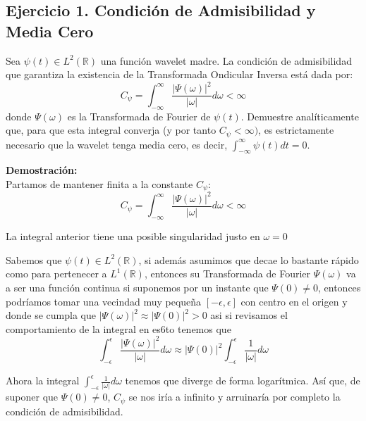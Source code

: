 \subsection*{Ejercicio 1. Condición de Admisibilidad y Media Cero} %
\noindent Sea $\psi(t)\in L^{2}(\mathbb{R})$ una función wavelet madre. %
La condición de admisibilidad que garantiza la existencia de la Transformada Ondicular Inversa está dada por: %
\begin{equation}
    C_{\psi}=\int_{-\infty}^{\infty}\frac{|\Psi(\omega)|^{2}}{|\omega|}d\omega<\infty %
\end{equation}
donde $\Psi(\omega)$ es la Transformada de Fourier de $\psi(t).$ %
Demuestre analíticamente que, para que esta integral converja (y por tanto $C_{\psi}<\infty)$, es estrictamente necesario que la wavelet tenga media cero, es decir, $\int_{-\infty}^{\infty}\psi(t)dt=0.$ %

\vspace{0.5cm}
\noindent \textbf{Demostración:} \\

Partamos de mantener finita a la constante $C_{\psi}$:
\begin{equation*}
    C_{\psi}=\int_{-\infty}^{\infty}\frac{|\Psi(\omega)|^{2}}{|\omega|}d\omega<\infty
\end{equation*}

La integral anterior tiene una posible singularidad justo en $\omega = 0$

Sabemos que $\psi(t) \in L^2(\mathbb{R})$, si además asumimos que decae lo bastante rápido como para pertenecer a $L^1(\mathbb{R})$, entonces su Transformada de Fourier $\Psi(\omega)$ va a ser una función continua si suponemos por un instante que $\Psi(0) \neq 0$, entonces podríamos tomar una vecindad muy pequeña $[-\epsilon, \epsilon]$ con centro en el origen y donde se cumpla que $|\Psi(\omega)|^2 \approx |\Psi(0)|^2 > 0$ asi si revisamos el comportamiento de la integral en es6to tenemos que
\begin{equation*}
    \int_{-\epsilon}^{\epsilon}\frac{|\Psi(\omega)|^{2}}{|\omega|}d\omega \approx |\Psi(0)|^{2} \int_{-\epsilon}^{\epsilon}\frac{1}{|\omega|}d\omega
\end{equation*}

Ahora la integral $\int_{-\epsilon}^{\epsilon}\frac{1}{|\omega|}d\omega$ tenemos que diverge de forma logarítmica. Así que, de suponer que $\Psi(0) \neq 0$, $C_{\psi}$ se nos iría a infinito y arruinaría por completo la condición de admisibilidad.

